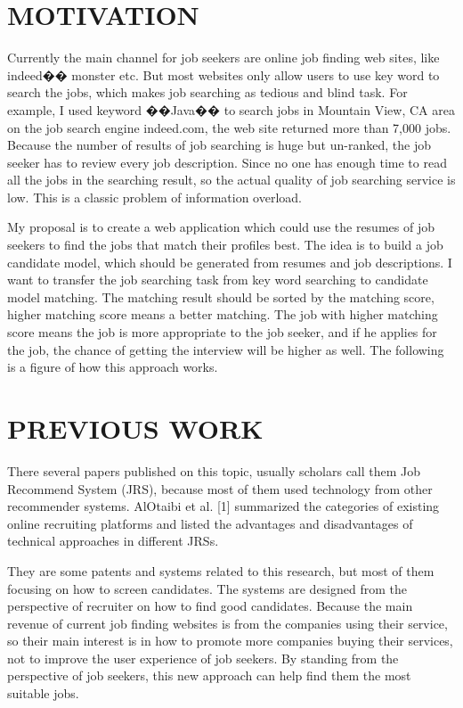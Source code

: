 


\section{MOTIVATION}
Currently the main channel for job seekers are online job finding web sites, like indeed�� monster etc. But most websites only allow users to use key word to search the jobs, which makes job searching as tedious and blind task. For example, I used keyword ��Java�� to search jobs in Mountain View, CA area on the job search engine indeed.com, the web site returned more than 7,000 jobs. Because the number of results of job searching is huge but un-ranked, the job seeker has to review every job description. Since no one has enough time to read all the jobs in the searching result, so the actual quality of job searching service is low. This is a classic problem of information overload.

My proposal is to create a web application which could use the resumes of job seekers to find the jobs that match their profiles best. The idea is to build a job candidate model, which should be generated from resumes and job descriptions. I want to transfer the job searching task from key word searching to candidate model matching. The matching result should be sorted by the matching score, higher matching score means a better matching. The job with higher matching score means the job is more appropriate to the job seeker, and if he applies for the job, the chance of getting the interview will be higher as well. The following is a figure of how this approach works.

\section{PREVIOUS WORK}

There several papers published on this topic, usually scholars call them Job Recommend System (JRS), because most of them used technology from other recommender systems. AlOtaibi et al. [1] summarized the categories of existing online recruiting platforms and listed the advantages and disadvantages of technical approaches in different JRSs.

They are some patents and systems related to this research, but most of them focusing on how to screen candidates. The systems are designed from the perspective of recruiter on how to find good candidates. Because the main revenue of current job finding websites is from the companies using their service, so their main interest is in how to promote more companies buying their services, not to improve the user experience of job seekers. By standing from the perspective of job seekers, this new approach can help find them the most suitable jobs.


